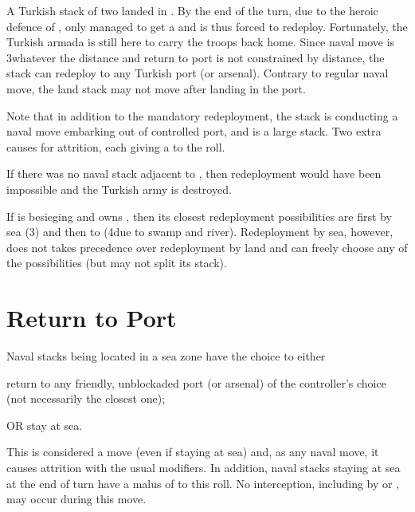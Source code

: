 \begin{exemple}
  A Turkish stack of two \Janissaire \ARMY\Faceplus landed in
  \provinceMalta. By the end of the turn, due to the heroic defence of
  , \TUR only managed to get a \USURE\Facemoins and is thus
  forced to redeploy. Fortunately, the Turkish armada is still here to carry
  the troops back home. Since naval move is 3\MP whatever the distance and
  return to port is not constrained by distance, the stack can redeploy to any
  Turkish port (or arsenal). Contrary to regular naval move, the land stack
  may not move after landing in the port.

  Note that in addition to the mandatory redeployment, the stack is conducting
  a naval move embarking out of controlled port, and is a large stack. Two
  extra causes for attrition, each giving a  to the roll.

  If there was no naval stack adjacent to \provinceMalta, then redeployment
  would have been impossible and the Turkish army is destroyed.

  \smallskip

  If \SUE is besieging \provinceDanzig and owns \provinceHinterpommern,
  then its closest redeployment possibilities are first by sea (3\MP)
  and then to \provinceHinterpommern (4\MP due to swamp and
  river). Redeployment by sea, however, does not takes precedence over
  redeployment by land and \SUE can freely choose any of the
  possibilities (but may not split its stack).
\end{exemple}

\section{Return to Port}\label{chRedep:Return port}
\aparag[Navies]
\bparag Naval stacks being located in a sea zone have the choice to either
\begin{modlist}
\item return to any friendly, unblockaded port (or arsenal) of the
  controller's choice (not necessarily the closest one);
\item OR stay at sea.
\end{modlist}
\bparag This is considered a move (even if staying at sea) and, as any naval
move, it causes attrition with the usual modifiers.
\bparag In addition, naval stacks staying at sea at the end of turn have a
malus of  to this roll.
\bparag No interception, including by \Presidios or \StraitFort, may occur
during this move.

